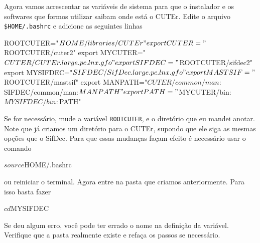 Agora vamos acrescentar as variáveis de sistema para que o instalador e os softwares
que formos utilizar saibam onde está o CUTEr. Edite o arquivo \verb+$HOME/.bashrc+ e
adicione as seguintes linhas
\begin{terminal}
ROOTCUTER="$HOME/libraries/CUTEr"
export CUTER="$ROOTCUTER/cuter2"
export MYCUTER="$CUTER/CUTEr.large.pc.lnx.gfo" 
export SIFDEC="$ROOTCUTER/sifdec2"
export MYSIFDEC="$SIFDEC/SifDec.large.pc.lnx.gfo" 
export MASTSIF="$ROOTCUTER/mastsif" 
export MANPATH="$CUTER/common/man:$SIFDEC/common/man:$MANPATH" 
export PATH="$MYCUTER/bin:$MYSIFDEC/bin:$PATH"
\end{terminal}
Se for necessário, mude a variável \verb+ROOTCUTER+, e o diretório que eu mandei anotar. 
Note que já criamos um diretório para o CUTEr, supondo que ele siga as mesmas opções
que o SifDec. 
Para que essas mudanças façam efeito é necessário usar o comando
\begin{terminal}
$ source $HOME/.bashrc
\end{terminal}
ou reiniciar o terminal.
Agora entre na pasta que criamos anteriormente. Para isso basta fazer
\begin{terminal}
$ cd $MYSIFDEC
\end{terminal}
Se deu algum erro, você pode ter errado o nome na definição da variável. Verifique que a
pasta realmente existe e refaça os passos se necessário.

